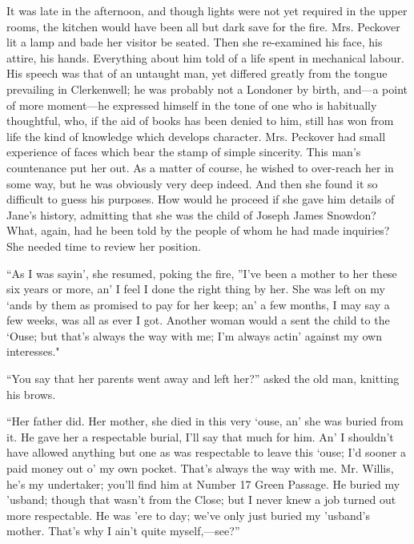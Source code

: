 It was late in the afternoon, and though lights were not yet required in
the upper rooms, the kitchen would have been all but dark save for the
fire. Mrs. Peckover lit a lamp and bade her visitor be seated. Then she
re-examined his face, his attire, his hands. Everything about him told
of a life spent in mechanical labour. His speech was that of an untaught
man, yet differed greatly from the tongue prevailing in Clerkenwell; he
was probably not a Londoner by birth, and---a point of more moment---he
expressed himself in the tone of one who is habitually thoughtful, who,
if the aid of books has been denied to him, still has won from life
{\protect\hypertarget{108}{}{}}the kind of knowledge which develops
character. Mrs. Peckover had small experience of faces which bear the
stamp of simple sincerity. This man's countenance put her out. As a
matter of course, he wished to over-reach her in some way, but he was
obviously very deep indeed. And then she found it so difficult to guess
his purposes. How would he proceed if she gave him details of Jane's
history, admitting that she was the child of Joseph James Snowdon? What,
again, had he been told by the people of whom he had made inquiries? She
needed time to review her position.

``As I was sayin', she resumed, poking the fire, ''I've been a mother to
her these six years or more, an' I feel I done the right thing by her.
She was left on my `ands by them as promised to pay for her keep; an' a
few months, I may say a few weeks, was all as ever I got. Another woman
would a sent the child to the `Ouse; but that's always the way with me;
I'm always actin' against my own interesses."

{\protect\hypertarget{109}{}{}}``You say that her parents went away and
left her?'' asked the old man, knitting his brows.

``Her father did. Her mother, she died in this very `ouse, an' she was
buried from it. He gave her a respectable burial, I'll say that much for
him. An' I shouldn't have allowed anything but one as was respectable to
leave this `ouse; I'd sooner a paid money out o' my own pocket. That's
always the way with me. Mr. Willis, he's my undertaker; you'll find him
at Number 17 Green Passage. He buried my 'usband; though that wasn't
from the Close; but I never knew a job turned out more respectable. He
was 'ere to day; we've only just buried my 'usband's mother. That's why
I ain't quite myself,---see?''

